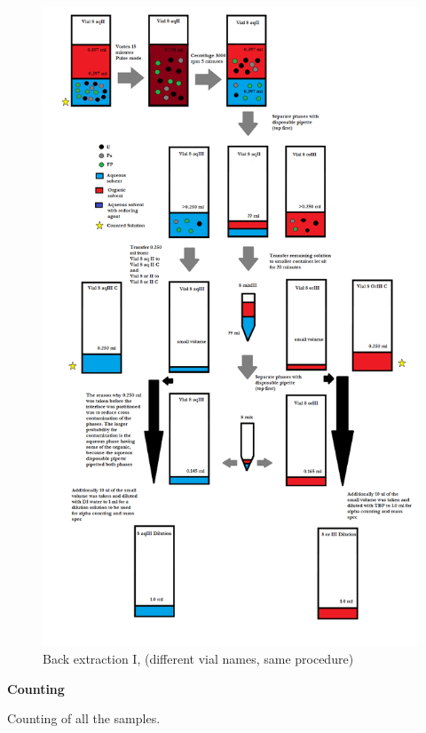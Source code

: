 \documentclass[idxtotoc,hyperref,openany,oneside]{labbook} %
\begin{document}
\begin{figure}[H] %
\begin{center}
  \includegraphics[width=0.8\linewidth]
                  {Figures/Cycle_x3_round_2_extraction_3}
\end{center}
\caption{Back extraction I, (different vial names, same procedure)}
\label{fig:round2_extraction3}
\end{figure}






\textbf{Counting}

Counting of all the samples.
\end{document}
